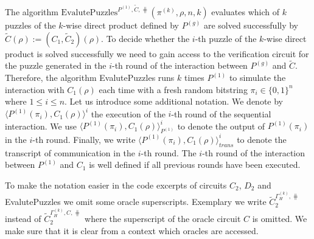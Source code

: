 %
%
The algorithm $\text{EvalutePuzzles}^{P^{(1)}, \widetilde{C}, \hash}(\pi^{(k)}, \rho, n, k)$
evaluates which of $k$ puzzles of the $k$-wise direct product defined by $P^{(g)}$ are solved successfully by $\widetilde{C}(\rho) := (C_1,\widetilde{C}_2)(\rho)$.
To decide whether the $i$-th puzzle of the $k$-wise direct product is solved successfully we need to gain access to the verification circuit
for the puzzle generated in the $i$-th round of the interaction between $P^{(g)}$ and $\widetilde{C}$.
Therefore, the algorithm EvalutePuzzles runs $k$ times $P^{(1)}$ to simulate the interaction with
$C_1(\rho)$ each time with a fresh random bitstring $\pi_i \in \{0,1\}^{n}$ where $1 \leq i \leq n$.
Let us introduce some additional notation.
We denote by $\langle P^{(1)}(\pi_i), C_1(\rho)\rangle^i$ the execution of the $i$-th round of the sequential interaction.
We use $\langle P^{(1)}(\pi_i), C_1(\rho)\rangle^i_{P^{(1)}}$ to denote the output of $P^{(1)}(\pi_i)$ in the $i$-th round.
Finally, we write $\langle P^{(1)}(\pi_i), C_1(\rho)\rangle^i_{\mathit{trans}}$ to denote the transcript of communication in the $i$-th round.
The $i$-th round of the interaction between $P^{(1)}$ and $C_1$ is well defined if all previous rounds have been executed.

To make the notation easier in the code excerpts of circuits $C_2$, $D_2$ and EvalutePuzzles we
omit some oracle superscripts. Exemplary we write $\widetilde{C}_2^{\Gamma_H^{(k)}, \hash}$ instead of $\widetilde{C}_2^{\Gamma_H^{(k)}, C, \hash}$ where
the superscript of the oracle circuit $C$ is omitted. We make sure that it is clear from a context which oracles are accessed.

